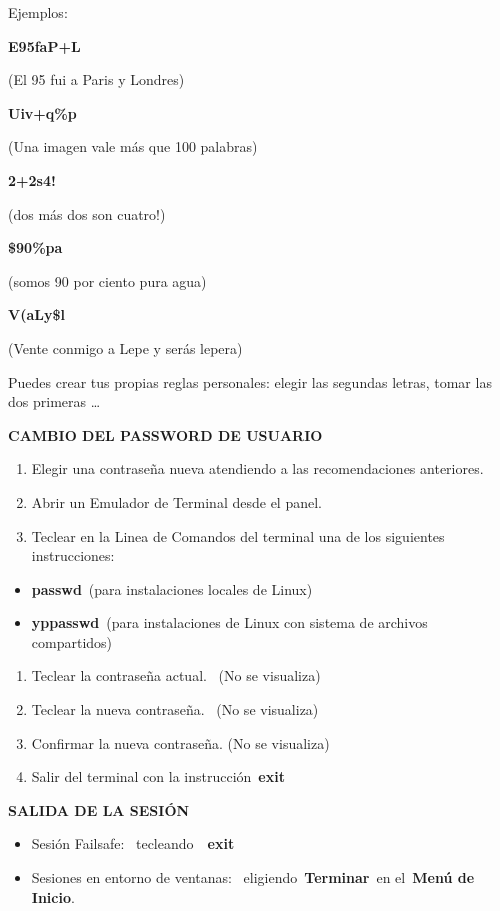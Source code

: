 \documentclass[
  letterpaper,
]{article}
\providecommand{\tightlist}{%
  \setlength{\itemsep}{0pt}\setlength{\parskip}{0pt}}\usepackage{longtable,booktabs,array}
\begin{document}
Ejemplos:

\textbf{E95faP+L}

(El 95 fui a Paris y Londres)

\textbf{Uiv+q\%p}

(Una imagen vale más que 100 palabras)

\textbf{2+2s4!}

(dos más dos son cuatro!)

\textbf{\$90\%pa}

(somos 90 por ciento pura agua)

\textbf{V(aLy\$l}

(Vente conmigo a Lepe y serás lepera)

Puedes crear tus propias reglas personales: elegir las segundas letras,
tomar las dos primeras \ldots{}

\textbf{CAMBIO DEL PASSWORD DE USUARIO}

\begin{enumerate}
\def\labelenumi{\arabic{enumi}.}
\tightlist
\item
  Elegir una contraseña nueva atendiendo a las recomendaciones
  anteriores.
\item
  Abrir un Emulador de Terminal desde el panel.
\item
  Teclear en la Linea de Comandos del terminal una de los siguientes
  instrucciones:
\end{enumerate}

\begin{itemize}
\tightlist
\item
  \textbf{passwd}~(para instalaciones locales de Linux)
\item
  \textbf{yppasswd}~(para instalaciones de Linux con sistema de archivos
  compartidos)
\end{itemize}

\begin{enumerate}
\def\labelenumi{\arabic{enumi}.}
\setcounter{enumi}{4}
\tightlist
\item
  Teclear la contraseña actual.~ (No se visualiza)
\item
  Teclear la nueva contraseña.~ (No se visualiza)
\item
  Confirmar la nueva contraseña. (No se visualiza)
\item
  Salir del terminal con la instrucción~\textbf{exit}
\end{enumerate}

\textbf{SALIDA DE LA SESIÓN}

\begin{itemize}
\tightlist
\item
  Sesión Failsafe:~ tecleando~~\textbf{exit}
\item
  Sesiones en entorno de ventanas:~ eligiendo~\textbf{Terminar}~en
  el~\textbf{Menú de Inicio}.
\end{itemize}
\end{document}
